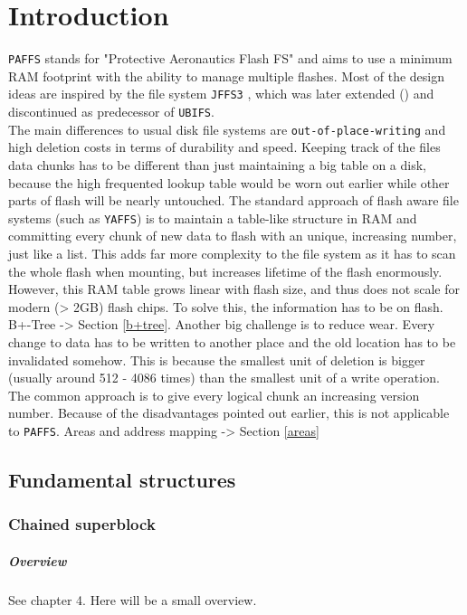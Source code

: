 
\chapter{Introduction}
\label{cha:introduction}

\texttt{PAFFS} stands for "Protective Aeronautics Flash FS" and aims to use a minimum RAM footprint with the ability to manage multiple flashes. Most of the design ideas are inspired by the file system \texttt{JFFS3} , which was later extended () and discontinued as predecessor of \texttt{UBIFS}.\\
The main differences to usual disk file systems are \texttt{out-of-place-writing} and high deletion costs in terms of durability and speed. Keeping track of the files data chunks has to be different than just maintaining a big table on a disk, because the high frequented lookup table would be worn out earlier while other parts of flash will be nearly untouched. The standard approach of flash aware file systems (such as \texttt{YAFFS}) is to maintain a table-like structure in RAM and committing every chunk of new data to flash with an unique, increasing number, just like a list. This adds far more complexity to the file system as it has to scan the whole flash when mounting, but increases lifetime of the flash enormously. However, this RAM table grows linear with flash size, and thus does not scale for modern (> 2GB) flash chips. To solve this, the information has to be on flash. B+-Tree -> Section \ref{b+tree}.
Another big challenge is to reduce wear. Every change to data has to be written to another place and the old location has to be invalidated somehow. This is because the smallest unit of deletion is bigger (usually around 512 - 4086 times) than the smallest unit of a write operation. The common approach is to give every logical chunk an increasing version number. Because of the disadvantages pointed out earlier, this is not applicable to \texttt{PAFFS}. Areas and address mapping -> Section \ref{areas}

\section{Fundamental structures}
\label{sec:funst}

\subsection{Chained superblock}
\label{chainedSB}
\paragraph{Overview}
See  chapter 4. Here will be a small overview.


